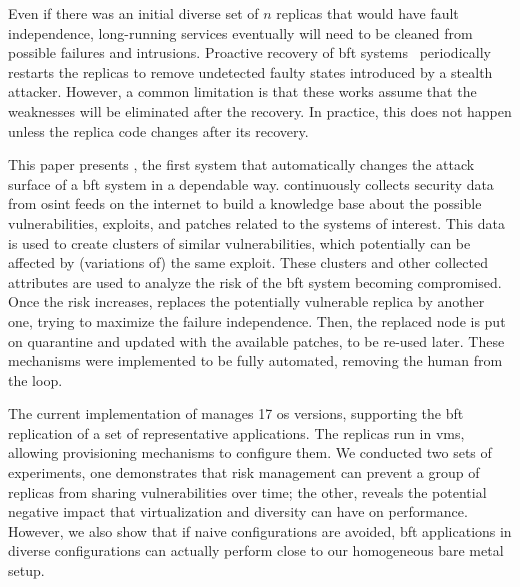 Even if there was an initial diverse set of $n$ replicas that would have fault independence, long-running services eventually will need to be cleaned from possible failures and intrusions.
Proactive recovery of \gls{bft} systems~\cite{Castro:2002,Sousa:2010,Roeder:2010,Platania:2014,Distler:2011} periodically restarts the replicas to remove undetected faulty states introduced by a stealth attacker. 
However, a common limitation is that these works assume that the weaknesses will be eliminated after the recovery.
In practice, this does not happen unless the replica code changes after its recovery.

This paper presents \system, 
the first system that automatically changes the attack surface of a \gls{bft} system in a dependable way.
\system continuously collects security data from \gls{osint} feeds on the internet to build a knowledge base about the possible vulnerabilities, exploits, and patches related to the systems of interest.
This data is used to create clusters of similar vulnerabilities, which potentially can be affected by (variations of) the same exploit.
These clusters and other collected attributes are used to analyze the risk of the \gls{bft} system becoming compromised. %
Once the risk increases, \system replaces the potentially vulnerable replica by another one, trying to maximize the failure independence. %
Then, the replaced node is put on quarantine and updated with the available patches, to be re-used later.
These mechanisms were implemented to be fully automated, removing the human from the loop.

The current implementation of \system manages 17 \gls{os} versions, supporting the \gls{bft} replication of a set of representative applications.
The replicas run in \glspl{vm}, allowing provisioning mechanisms to configure them. 
We conducted two sets of experiments, one demonstrates that \system risk management can prevent a group of replicas from sharing vulnerabilities over time; the other, reveals the potential negative impact that virtualization and diversity can have on performance. However, we also show that if naive configurations are avoided, \gls{bft} applications in diverse configurations can actually perform close to our homogeneous bare metal setup.

